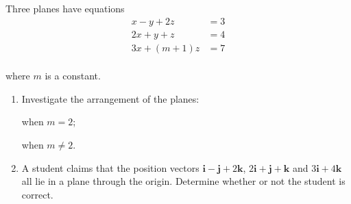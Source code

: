 \documentclass[leqno]{article}
\begin{document}
\begin{enumerate}[
  label=\textbf{\arabic*.},
  leftmargin=*,
  topsep=0pt,
  partopsep=0pt,
  parsep=0pt
]
\newpage

\questionitem

Three planes have equations
\[
\begin{aligned}
x-y+2z&=3\\
2x+y+z&=4\\
3x+(m+1)z&=7
\end{aligned}
\] \\
where $m$ is a constant. \\
\begin{enumerate}[label=\textbf{(\alph*)}]
  \item Investigate the arrangement of the planes:

  when $m=2$;

  when $m\ne 2$.  \\
  \item A student claims that the position vectors $\mathbf{i}-\mathbf{j}+2\mathbf{k}$, $2\mathbf{i}+\mathbf{j}+\mathbf{k}$ and $3\mathbf{i}+4\mathbf{k}$ all lie in a plane through the origin. Determine whether or not the student is correct.  \\
\end{enumerate}

\newpage

\questionitem


\end{enumerate}
\end{document}
